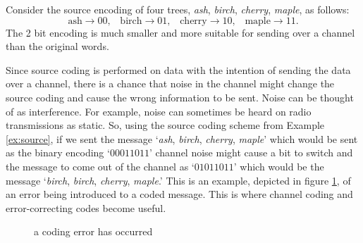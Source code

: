 \begin{example} \label{ex:source}
    Consider the source encoding of four trees, \textit{ash}, \textit{birch}, \textit{cherry}, \textit{maple}, as follows:
    \[
        \text{ash} \to 00, \hspace{10pt}\text{birch} \to 01, \hspace{10pt} \text{cherry} \to 10, \hspace{10pt} \text{maple} \to 11.
    \]
    The 2 bit encoding is much smaller and more suitable for sending over a channel than the original words.
\end{example}

Since source coding is performed on data with the intention of sending the data over a channel, there is a chance that noise in the channel might change the source coding and cause the wrong information to be sent. Noise can be thought of as interference. For example, noise can sometimes be heard on radio transmissions as static. So, using the source coding scheme from Example \ref{ex:source}, if we sent the message `\textit{ash}, \textit{birch}, \textit{cherry}, \textit{maple}' which would be sent as the binary encoding `$00011011$' channel noise might cause a bit to switch and the message to come out of the channel as `$01011011$' which would be the message `\textit{birch}, \textit{birch}, \textit{cherry}, \textit{maple}.' This is an example, depicted in figure \ref{fig:pathexample}, of an error being introduced to a coded message. This is where channel coding and error-correcting codes become useful.

\begin{figure}
\centering
    \caption{a coding error has occurred}
    \label{fig:pathexample}
\end{figure}

